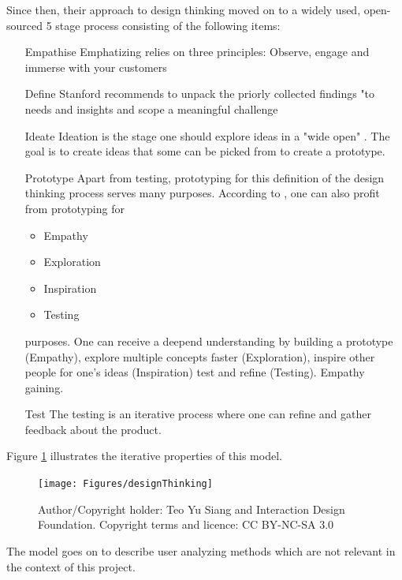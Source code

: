 Since then, their approach to design thinking moved on to a widely used, open-sourced 5 stage process \parencite{designThinkingCrashCourse}
consisting of the following items:
\begin{itemize}
    \item [Empathise]
    Emphatizing relies on three principles: Observe, engage and immerse with your customers
    \item [Define]
    Stanford recommends to unpack the priorly collected findings "to needs and insights and scope a meaningful challenge \parencite{designThinkingBootleg}
    \item [Ideate]
    Ideation is the stage one should explore ideas in a "wide open" \parencite{designThinkingBootleg}. The goal is to create ideas that some 
    can be picked from to create a prototype.
    \item [Prototype]
    Apart from testing, prototyping for this definition of the design thinking process serves many purposes. 
    According to \parencite{designThinkingBootleg}, one can also profit from prototyping for
    \begin{itemize}
        \item Empathy
        \item Exploration
        \item Inspiration
        \item Testing
    \end{itemize}
    purposes. One can receive a deepend understanding by building a prototype (Empathy), explore multiple concepts faster (Exploration),
    inspire other people for one's ideas (Inspiration) test and refine (Testing). 
    Empathy gaining.
    \item [Test]
    The testing is an iterative process where one can refine and gather feedback about the product.
\end{itemize}
Figure \ref{fig:designThinking} illustrates the iterative properties of this model.

\begin{figure}[th]
	\centering
	\texttt{[image: Figures/designThinking]}
	\decoRule
	\caption[designThinking]{Author/Copyright holder: Teo Yu Siang and Interaction Design Foundation. Copyright terms and licence: CC BY-NC-SA 3.0}
	\label{fig:designThinking}
\end{figure}

The model goes on to describe user analyzing methods which are not relevant in the context of this project.

